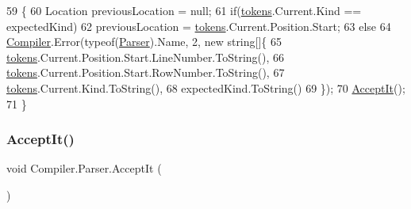 \begin{DoxyCode}
59                                                                   \{
60                         Location previousLocation = null;
61                         \textcolor{keywordflow}{if}(\mbox{\hyperlink{class_compiler_1_1_parser_a4db075175c853a197c7b8db7d787a0a5}{tokens}}.Current.Kind == expectedKind)
62                             previousLocation = \mbox{\hyperlink{class_compiler_1_1_parser_a4db075175c853a197c7b8db7d787a0a5}{tokens}}.Current.Position.Start;
63                         \textcolor{keywordflow}{else}
64                             \mbox{\hyperlink{namespace_compiler}{Compiler}}.Error(typeof(\mbox{\hyperlink{class_compiler_1_1_parser_a450e11452db3f91ff866fc1e36ebc79d}{Parser}}).Name, 2, \textcolor{keyword}{new} \textcolor{keywordtype}{string}[]\{
65                                 \mbox{\hyperlink{class_compiler_1_1_parser_a4db075175c853a197c7b8db7d787a0a5}{tokens}}.Current.Position.Start.LineNumber.ToString(),
66                                 \mbox{\hyperlink{class_compiler_1_1_parser_a4db075175c853a197c7b8db7d787a0a5}{tokens}}.Current.Position.Start.RowNumber.ToString(),
67                                 \mbox{\hyperlink{class_compiler_1_1_parser_a4db075175c853a197c7b8db7d787a0a5}{tokens}}.Current.Kind.ToString(),
68                                 expectedKind.ToString()
69                             \});
70                         \mbox{\hyperlink{class_compiler_1_1_parser_ae19e507e1e2460cbad35b03d24402b4f}{AcceptIt}}();
71                     \}
\end{DoxyCode}
\mbox{\label{class_compiler_1_1_parser_ae19e507e1e2460cbad35b03d24402b4f}} 
\subsubsection{\texorpdfstring{Accept\+It()}{AcceptIt()}}
{\footnotesize\ttfamily void Compiler.\+Parser.\+Accept\+It (\begin{DoxyParamCaption}{ }\end{DoxyParamCaption})\hspace{0.3cm}{\ttfamily [protected]}}

